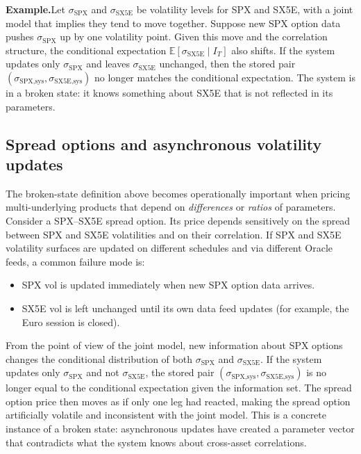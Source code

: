 \documentclass[11pt,a4paper]{article}
\begin{document}
\textbf{Example.}\quad Let $\sigma_{\text{SPX}}$ and $\sigma_{\text{SX5E}}$ be volatility levels for SPX and SX5E, with a joint model that implies they tend to move together. Suppose new SPX option data pushes $\sigma_{\text{SPX}}$ up by one volatility point. Given this move and the correlation structure, the conditional expectation $\mathbb{E}[\sigma_{\text{SX5E}} \mid I_T]$ also shifts. If the system updates only $\sigma_{\text{SPX}}$ and leaves $\sigma_{\text{SX5E}}$ unchanged, then the stored pair $(\sigma_{\text{SPX,sys}}, \sigma_{\text{SX5E,sys}})$ no longer matches the conditional expectation. The system is in a broken state: it knows something about SX5E that is not reflected in its parameters.

\subsection{Spread options and asynchronous volatility updates}

The broken-state definition above becomes operationally important when pricing multi-underlying products that depend on \textit{differences} or \textit{ratios} of parameters. Consider a SPX--SX5E spread option. Its price depends sensitively on the spread between SPX and SX5E volatilities and on their correlation. If SPX and SX5E volatility surfaces are updated on different schedules and via different Oracle feeds, a common failure mode is:
\begin{itemize}
    \item SPX vol is updated immediately when new SPX option data arrives.
    \item SX5E vol is left unchanged until its own data feed updates (for example, the Euro session is closed).
\end{itemize}

From the point of view of the joint model, new information about SPX options changes the conditional distribution of both $\sigma_{\text{SPX}}$ and $\sigma_{\text{SX5E}}$. If the system updates only $\sigma_{\text{SPX}}$ and not $\sigma_{\text{SX5E}}$, the stored pair $(\sigma_{\text{SPX,sys}}, \sigma_{\text{SX5E,sys}})$ is no longer equal to the conditional expectation given the information set. The spread option price then moves as if only one leg had reacted, making the spread option artificially volatile and inconsistent with the joint model. This is a concrete instance of a broken state: asynchronous updates have created a parameter vector that contradicts what the system knows about cross-asset correlations.
\end{document}
